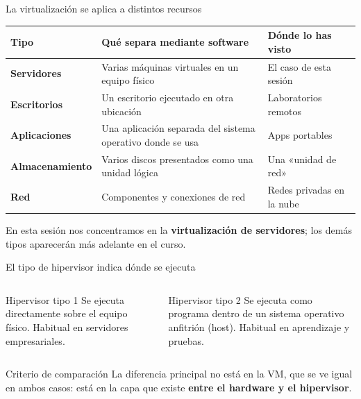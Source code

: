 \documentclass[aspectratio=169,10pt,c]{beamer}
\begin{document}
\begin{frame}{La virtualización se aplica a distintos recursos}
\begin{center}
\small
\begin{tabular}{>{\bfseries}p{2.9cm}p{4.4cm}p{3.7cm}}
\toprule
Tipo & Qué separa mediante software & Dónde lo has visto \\
\midrule
Servidores & Varias máquinas virtuales en un equipo físico & El caso de esta sesión \\
Escritorios & Un escritorio ejecutado en otra ubicación & Laboratorios remotos \\
Aplicaciones & Una aplicación separada del sistema operativo donde se usa & Apps portables \\
Almacenamiento & Varios discos presentados como una unidad lógica & Una «unidad de red» \\
Red & Componentes y conexiones de red & Redes privadas en la nube \\
\bottomrule
\end{tabular}
\end{center}
\vspace{0.2cm}
\small En esta sesión nos concentramos en la \textbf{virtualización de servidores}; los demás tipos aparecerán más adelante en el curso.
\end{frame}

\begin{frame}{El tipo de hipervisor indica dónde se ejecuta}
\begin{columns}[T,onlytextwidth]
\begin{block}{Hipervisor tipo 1}
\small Se ejecuta directamente sobre el equipo físico. Habitual en servidores empresariales.\\[2pt]
   
\end{block}
\begin{block}{Hipervisor tipo 2}
\small Se ejecuta como programa dentro de un sistema operativo anfitrión (host). Habitual en aprendizaje y pruebas.\\[2pt]
  
\end{block}
\end{columns}
\vspace{0.25cm}
\begin{alertblock}{Criterio de comparación}
La diferencia principal no está en la VM, que se ve igual en ambos casos: está en la capa que existe \textbf{entre el hardware y el hipervisor}.
\end{alertblock}
\end{frame}
\end{document}
